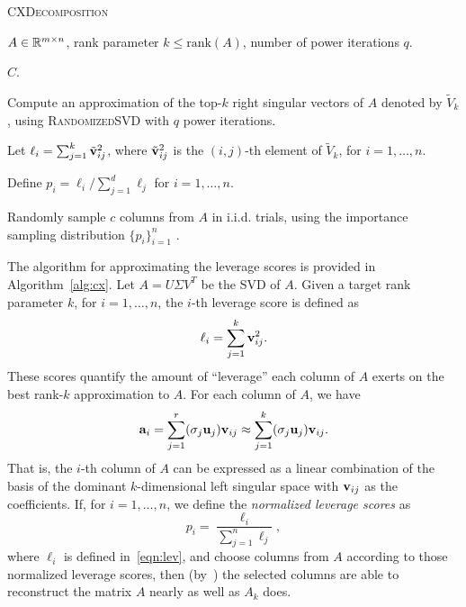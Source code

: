 \begin{algorithm}[tb]
 \caption{\textsc{CXDecomposition}}
  \label{alg:cx}
  \begin{algorithmic}[1]
    \Require $A \in \mathbb{R}^{m\times n}$, rank parameter $k \leq \textrm{rank}(A)$, number of power iterations $q$.

    \Ensure $C$.
    

    \State Compute an approximation of the top-$k$ right singular vectors of $A$ denoted by $\tilde V_k$, using \textsc{RandomizedSVD} with $q$ power iterations.
    
    \State Let $\ell_i = \sum_{j=1}^k \tilde {\mathbf{v}}_{ij}^2$, where $\tilde {\mathbf{v}}_{ij}^2$ is the $(i,j)$-th element of $\tilde V_k$, for $i = 1, \ldots, n$. 
    
    \State Define $p_i = \ell_i / \sum_{j=1}^d \ell_j$ for $i=1,\ldots,n$.
    
    \State Randomly sample $c$ columns from $A$ in i.i.d. trials, using the importance sampling distribution $\{p_i\}_{i=1}^n$ .

    

    \end{algorithmic}
\end{algorithm}

The algorithm for approximating the leverage scores is
provided in Algorithm~\ref{alg:cx}.
Let $A=U\Sigma V^T$ be the SVD of $A$.
Given a target rank parameter $k$, for $i=1,\ldots,n$, the $i$-th leverage score is defined as
\begin{equation}
 \label{eqn:lev}
  \ell_i = \sum_{j=1}^k \v_{ij}^2.
\end{equation}
These scores quantify the amount of ``leverage'' each column of $A$ exerts on the best rank-$k$ approximation to $A$. 
For each column of $A$, we have 
  $$  \mathbf{a}_i = \sum_{j=1}^{r} (\sigma_j \mathbf{u}_j) \mathbf{v}_{ij} \approx \sum_{j=1}^k (\sigma_j \mathbf{u}_j) \mathbf{v}_{ij}.  $$
  That is, the $i$-th column of $A$ can be expressed as a linear combination of the basis of the dominant $k$-dimensional left singular space with $\mathbf{v}_{ij}$ as the coefficients.
If, for $i=1,\ldots,n$, we define the {\it normalized leverage scores} as
\begin{equation}
\label{eqn:nlev}
  p_i = \frac{\ell_i}{\sum_{j=1}^n \ell_j},
\end{equation}      
where $\ell_i$ is defined in~\eqref{eqn:lev}, and choose columns from $A$ according to those normalized leverage scores, then (by~\cite{DMM08,CUR_PNAS}) the selected columns are able to reconstruct the matrix $A$ nearly as well as $A_k$ does.

